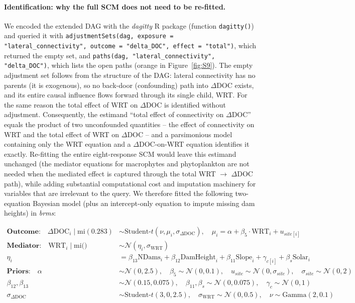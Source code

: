 \documentclass[11pt,a4paper]{article}
\begin{document}
\paragraph{Identification: why the full SCM does not need to be re-fitted.} We encoded the extended DAG with the \emph{dagitty} R package (function \texttt{dagitty()}) and queried it with \texttt{adjustmentSets(dag, exposure = "lateral\_connectivity", outcome = "delta\_DOC", effect = "total")}, which returned the empty set, and \texttt{paths(dag, "lateral\_connectivity", "delta\_DOC")}, which lists the open paths (orange in Figure~\ref{fig:S9}). The empty adjustment set follows from the structure of the DAG: lateral connectivity has no parents (it is exogenous), so no back-door (confounding) path into $\Delta$DOC exists, and its entire causal influence flows forward through its single child, WRT. For the same reason the total effect of WRT on $\Delta$DOC is identified without adjustment. Consequently, the estimand ``total effect of connectivity on $\Delta$DOC'' equals the product of two unconfounded quantities -- the effect of connectivity on WRT and the total effect of WRT on $\Delta$DOC -- and a parsimonious model containing only the WRT equation and a $\Delta$DOC-on-WRT equation identifies it exactly. Re-fitting the entire eight-response SCM would leave this estimand unchanged (the mediator equations for macrophytes and phytoplankton are not needed when the mediated effect is captured through the total WRT $\rightarrow$ $\Delta$DOC path), while adding substantial computational cost and imputation machinery for variables that are irrelevant to the query. We therefore fitted the following two-equation Bayesian model (plus an intercept-only equation to impute missing dam heights) in \emph{brms}:

\begin{equation}
\begin{aligned}
\textbf{Outcome:} \quad \Delta \text{DOC}_i \mid \text{mi}(0.283) &\sim \text{Student-}t(\nu, \mu_i, \sigma_{\Delta \text{DOC}}), \quad \mu_i = \alpha + \beta_5 \cdot \text{WRT}_i + u_{site[i]} \\[0.5em]
\textbf{Mediator:} \quad \text{WRT}_i \mid \text{mi()} &\sim \mathcal{N}(\eta_i, \sigma_{\text{WRT}}) \\
\eta_i &= \beta_{13} \text{NDams}_i + \beta_{12} \text{DamHeight}_i + \beta_{11} \text{Slope}_i + \gamma_{c[i]} + \beta_{s} \text{Solar}_i \\[0.5em]
\textbf{Priors:} \quad \alpha &\sim \mathcal{N}(0, 2.5), \quad \beta_5 \sim \mathcal{N}(0, 0.1), \quad u_{site} \sim \mathcal{N}(0, \sigma_{site}), \quad \sigma_{site} \sim \mathcal{N}(0, 2) \\
\beta_{12}, \beta_{13} &\sim \mathcal{N}(0.15, 0.075), \quad \beta_{11}, \beta_{s} \sim \mathcal{N}(0, 0.075), \quad \gamma_{c} \sim \mathcal{N}(0, 1) \\
\sigma_{\Delta \text{DOC}} &\sim \text{Student-}t(3, 0, 2.5), \quad \sigma_{\text{WRT}} \sim \mathcal{N}(0, 0.5), \quad \nu \sim \text{Gamma}(2, 0.1)
\end{aligned}
\label{eq:altscm}
\end{equation}
\end{document}
